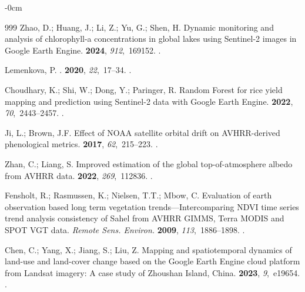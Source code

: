 \documentclass[coasts,article,accept,pdftex,oneauthor]{Definitions/mdpi}
\begin{document}
\begin{adjustwidth}{-\extralength}{0cm}
\begin{thebibliography}{999}
Zhao, D.; Huang, J.; Li, Z.; Yu, G.; Shen, H.
\newblock Dynamic monitoring and analysis of chlorophyll-a concentrations in
  global lakes using Sentinel-2 images in Google Earth Engine.
 {\bf 2024}, {\em 912},~169152.
.

Lemenkova, P.
.
  {\bf 2020}, {\em 22},~17--34.
.

Choudhary, K.; Shi, W.; Dong, Y.; Paringer, R.
\newblock Random Forest for rice yield mapping and prediction using Sentinel-2
  data with Google Earth Engine.
 {\bf 2022}, {\em 70},~2443--2457.
.

Ji, L.; Brown, J.F.
\newblock Effect of NOAA satellite orbital drift on AVHRR-derived phenological
  metrics.
 {\bf 2017}, {\em 62},~215--223.
.

Zhan, C.; Liang, S.
\newblock Improved estimation of the global top-of-atmosphere albedo from AVHRR
  data.
 {\bf 2022}, {\em 269},~112836.
.

Fensholt, R.; Rasmussen, K.; Nielsen, T.T.; Mbow, C.
 Evaluation of earth observation based long term vegetation \mbox{trends---Intercomparing} NDVI time series trend analysis consistency of Sahel from
  AVHRR GIMMS, Terra MODIS and SPOT VGT data.
 {\em Remote Sens. Environ.} {\bf 2009}, {\em
  113},~1886--1898.
.

Chen, C.; Yang, X.; Jiang, S.; Liu, Z.
\newblock Mapping and spatiotemporal dynamics of land-use and land-cover change
  based on the Google Earth Engine cloud platform from Landsat imagery: A case
  study of Zhoushan Island, China.
 {\bf 2023}, {\em 9},~e19654.
.


\end{thebibliography}
\end{adjustwidth}
\end{document}
